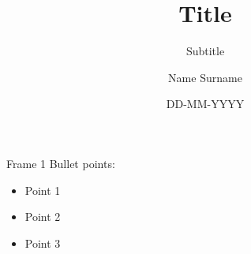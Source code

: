 \documentclass[pdf]{beamer}
\date{DD-MM-YYYY}
\title{Title}
\subtitle{Subtitle}
\author{Name Surname}
\begin{document}
\begin{frame}
\titlepage
\end{frame}

\begin{frame}{Frame 1}
Bullet points:

\begin{itemize}
\item Point 1
\item Point 2
\item Point 3
\end{itemize}

\vfill
\end{frame}
\end{document}
